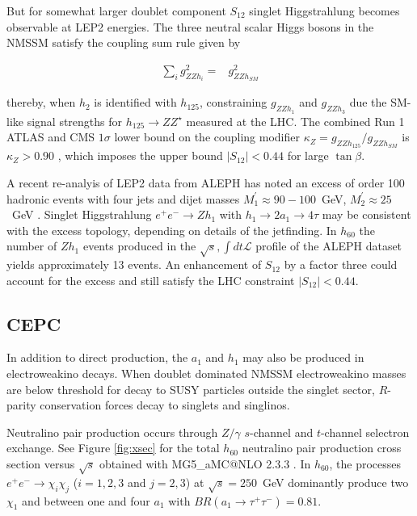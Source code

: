 \documentclass{ws-ijmpa}
\begin{document}
But for somewhat larger doublet component $S_{12}$ singlet Higgstrahlung becomes observable at LEP2 energies. The three neutral scalar Higgs bosons in the NMSSM satisfy the coupling sum rule given by \cite{Ellwanger:2009dp} 

\begin{eqnarray}
 \sum_{i} g^{2}_{ZZh_i} = & g^{2}_{ZZh_{SM}}
\end{eqnarray}

\noindent thereby, when $h_2$ is identified with $h_{125}$, constraining $g_{ZZh_1}$ and $g_{ZZh_3}$  due the SM-like signal strengths for $h_{125} \rightarrow ZZ^{\star}$ measured at the LHC. The combined Run 1 ATLAS and CMS $1\sigma$ lower bound on the coupling modifier $\kappa_{Z}=g_{ZZh_{125}}/g_{ZZh_{SM}}$ is $\kappa_{Z} > 0.90$ \cite{Khachatryan:2016vau}, which imposes the upper bound $\vert S_{12}\vert <0.44$ for large $\tan \beta$.

A recent re-analyis of LEP2 data from ALEPH has noted an excess of order 100 hadronic events with four jets and dijet masses $M_1^{\prime}\approx 90-100$~GeV, $M_{2}^{\prime} \approx 25$~GeV \cite{Kile:2017ccn}. Singlet Higgstrahlung $e^+ e^- \rightarrow  Z h_1$ with $h_1 \rightarrow 2a_1 \rightarrow 4\tau$ may be consistent with the excess topology, depending on details of the jetfinding. In $h_{60}$ the number of $Zh_1$ events produced in the $\sqrt{s},\int dt \mathcal{L}$ profile of the ALEPH dataset \cite{Kile:2017ccn} yields approximately 13 events. An enhancement of $S_{12}$ by a factor three could account for the excess and still satisfy the LHC constraint $\vert S_{12}\vert <0.44$.

\subsection{CEPC}

In addition to direct production, the $a_1$ and $h_1$ may also be produced in electroweakino decays. When doublet dominated NMSSM electroweakino masses are below threshold for decay to SUSY particles outside the singlet sector,  $R$-parity conservation forces decay to singlets and singlinos. 

Neutralino pair production occurs through $Z/\gamma$ $s$-channel and $t$-channel selectron exchange. See Figure \ref{fig:xsec} for the total $h_{60}$ neutralino pair production cross section versus $\sqrt{s}$ obtained with MG5\_aMC@NLO 2.3.3 \cite{Alwall:2014hca}.   In $h_{60}$, the processes $e^+ e^- \rightarrow \chi_{i} \chi_{j}$ ($i=1,2,3$ and $j=2,3$) at $\sqrt{s}=250$~GeV dominantly produce two $\chi_1$ and between one and four $a_1$ with $BR(a_1 \rightarrow \tau^+ \tau^-) =0.81$.  
\end{document}
